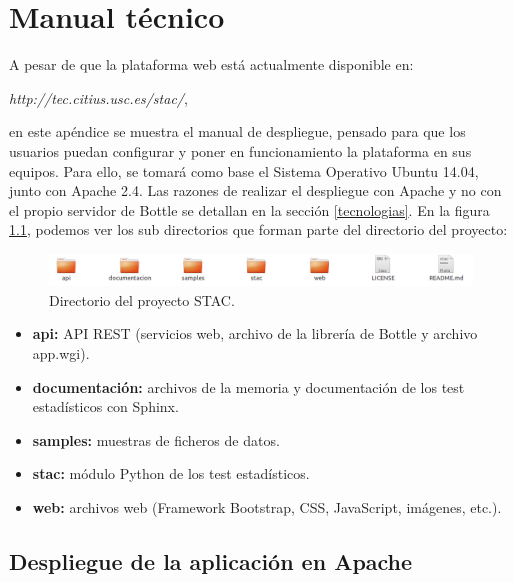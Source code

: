 \chapter{Manual técnico}
\noindent
A pesar de que la plataforma web está actualmente disponible en:

\begin{center}
\textit{http://tec.citius.usc.es/stac/},
\end{center}

\noindent
en este apéndice se muestra el manual de despliegue, pensado para que los usuarios puedan configurar y poner en funcionamiento la plataforma en sus equipos. Para ello, se tomará como base el Sistema Operativo Ubuntu 14.04, junto con Apache 2.4. Las razones de realizar el despliegue con Apache y no con el propio servidor de Bottle se detallan en la sección \ref{tecnologias}. En la figura \ref{fig:directorio_proy}, podemos ver los sub directorios que forman parte del directorio del proyecto:

\begin{figure}[H]
\centering
\includegraphics[scale=0.5]{figuras/directorio_proy.png}
\caption{Directorio del proyecto STAC.}
\label{fig:directorio_proy}
\end{figure}

\begin{itemize}
\item \textbf{api:} API REST (servicios web, archivo de la librería de Bottle y archivo app.wgi).
\item \textbf{documentación:} archivos de la memoria y documentación de los test estadísticos con Sphinx.
\item \textbf{samples:} muestras de ficheros de datos.
\item \textbf{stac:} módulo Python de los test estadísticos.
\item \textbf{web:} archivos web (Framework Bootstrap, CSS, JavaScript, imágenes, etc.).
\end{itemize}

\section{Despliegue de la aplicación en Apache}


